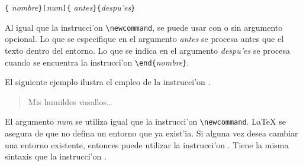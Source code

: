 \begin{command}
\verb|{|%
       \emph{nombre}\verb|}[|\emph{num}\verb|]{|%
       \emph{antes}\verb|}{|\emph{despu'es}\verb|}|
\end{command}

Al igual que la instrucci'on \verb|\newcommand|, se puede usar
 con o sin argumento opcional. Lo que se
especifique en el argumento \emph{antes} se procesa antes que el texto
dentro del entorno. Lo que se indica en el argumento \emph{despu'es}
se procesa cuando se encuentra la instrucci'on
\verb|\end{|\emph{nombre}\verb|}|.

El siguiente ejemplo ilustra el empleo de la instrucci'on
.

\begin{example}
\newenvironment{king}
    {\begin{quote}}{\end{quote}}
\begin{king}
Mis humildes vasallos\ldots
\end{king}
\end{example}

El argumento \emph{num} se utiliza igual que la instrucci'on
\verb|\newcommand|. \LaTeX{} se asegura de que no defina un entorno
que ya exist'ia. Si alguna vez desea cambiar una entorno existente,
entonces puede utilizar la instrucci'on . Tiene
la misma sintaxis que la instrucci'on .


\endinput
